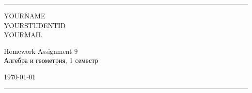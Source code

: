 \documentclass[a4paper, 12pt]{article}
\begin{document}

\fancyhead[C]{}
\hrule \medskip %
\begin{minipage}{0.295\textwidth}
\raggedright\footnotesize
YOURNAME \hfill\\
YOURSTUDENTID \hfill\\
YOURMAIL
\end{minipage}
\begin{minipage}{0.4\textwidth}
\centering\large
Homework Assignment 9\\
\normalsize
Алгебра и геометрия, 1 семестр\\
\end{minipage}
\begin{minipage}{0.295\textwidth}
\raggedleft
\today\hfill\\
\end{minipage}
\medskip\hrule
\bigskip

\end{document}
